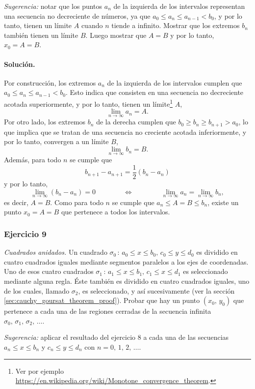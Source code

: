 \documentclass[a4paper]{report}
\begin{document}
\emph{Sugerencia:} notar que los puntos \(a_n\) de la izquierda de los intervalos representan una secuencia no decreciente de números, ya que \(a_0\leq a_n\leq a_{n-1}<b_0\), y por lo tanto, tienen un límite \(A\) cuando \(n\) tiende a infinito. Mostrar que los extremos \(b_n\) también tienen un límite \(B\). Luego mostrar que \(A=B\) y por lo tanto, \(x_0=A=B\).

\paragraph{Solución.} Por construcción, los extremos \(a_n\) de la izquierda de los intervalos cumplen que \(a_0\leq a_n\leq a_{n-1}<b_0\). Esto indica que consisten en una secuencia no decreciente acotada superiormente, y por lo tanto, tienen un límite\footnote{Ver por ejemplo \url{https://en.wikipedia.org/wiki/Monotone_convergence_theorem}.} \(A\),
\[
 \lim_{n\to\infty}a_n=A.
\]
Por otro lado, los extremos \(b_n\) de la derecha cumplen que \(b_0\geq b_{n}\geq b_{n+1}>a_0\), lo que implica que se tratan de una secuencia no creciente acotada inferiormente, y por lo tanto, convergen a un límite \(B\),
\[
 \lim_{n\to\infty}b_n=B.
\]
Además, para todo \(n\) se cumple que 
\[
 b_{n+1}-a_{n+1}=\frac{1}{2}(b_n-a_n)
\]
y por lo tanto,
\[
 \lim_{n\to\infty}(b_n-a_n)=0
 \qquad\qquad\Leftrightarrow\qquad\qquad
 \lim_{n\to\infty}a_n=\lim_{n\to\infty}b_n,
\]
es decir, \(A=B\). Como para todo \(n\) se cumple que \(a_n\leq A=B\leq b_n\), existe un punto \(x_0=A=B\) que pertenece a todos los intervalos.

\subsubsection*{Ejercicio 9}

\emph{Cuadrados anidados.} Un cuadrado \(\sigma_0\,:\,a_0\leq x\leq b_0,\,c_0\leq y\leq d_0\) es dividido en cuatro cuadrados iguales mediante segmentos paralelos a los ejes de coordenadas. Uno de esos cuatro cuadrados \(\sigma_1\,:\,a_1\leq x\leq b_1,\,c_1\leq x\leq d_1\) es seleccionado mediante alguna regla. Éste también es dividido en cuatro cuadrados iguales, uno de los cuales, llamado \(\sigma_2\), es seleccionado, y así sucesivamente (ver la sección \ref{sec:cauchy_goursat_theorem_proof}). Probar que hay un punto \((x_0,\,y_0)\) que pertenece a cada una de las regiones cerradas de la secuencia infinita \(\sigma_0,\,\sigma_1,\,\sigma_2,\,\dots\).

\emph{Sugerencia:} aplicar el resultado del ejercicio 8 a cada una de las secuencias \(a_n\leq x\leq b_n\) y \(c_n\leq y\leq d_n\) con \(n=0,\,1,\,2,\,\dots\).
\end{document}
